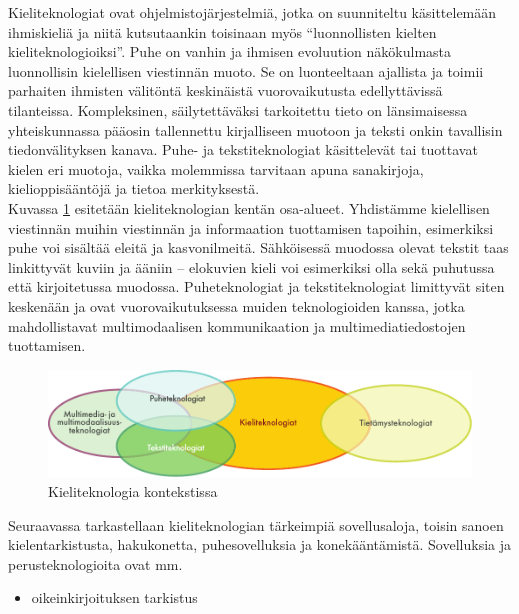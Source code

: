 \begin{multicols}{2}
Kieliteknologiat ovat ohjelmistojärjestelmiä, jotka on suunniteltu
käsittelemään ihmiskieliä ja niitä kutsutaankin toisinaan myös
“luonnollisten kielten kieliteknologioiksi”. Puhe on vanhin ja ihmisen 
evoluution näkökulmasta luonnollisin kielellisen viestinnän muoto. Se on 
luonteeltaan ajallista ja toimii parhaiten 
ihmisten välitöntä keskinäistä vuorovaikutusta edellyttävissä tilanteissa. 
Kompleksinen, säilytettäväksi tarkoitettu tieto on länsimaisessa yhteiskunnassa
pääosin tallennettu kirjalliseen muotoon ja teksti onkin tavallisin
tiedonvälityksen kanava. Puhe- ja tekstiteknologiat käsittelevät tai
tuottavat kielen eri muotoja, vaikka molemmissa tarvitaan apuna
sanakirjoja, kielioppisääntöjä ja tietoa merkityksestä.\\
Kuvassa \ref{fig:ltincontext-fin} esitetään kieliteknologian kentän
osa-alueet.  Yhdistämme kielellisen viestinnän muihin viestinnän ja
informaation tuottamisen tapoihin, esimerkiksi puhe voi sisältää
eleitä ja kasvonilmeitä. Sähköisessä muodossa olevat tekstit taas
linkittyvät kuviin ja ääniin -- elokuvien kieli voi esimerkiksi olla
sekä puhutussa että kirjoitetussa muodossa. Puheteknologiat ja
tekstiteknologiat limittyvät siten keskenään ja ovat
vuorovaikutuksessa muiden teknologioiden kanssa, jotka mahdollistavat
multimodaalisen kommunikaation ja multimediatiedostojen tuottamisen.

\begin{figure}[htb]
  \center
  \includegraphics[width=\textwidth]{../_media/finnish/language_technologies}
  \caption{Kieliteknologia kontekstissa}
  \label{fig:ltincontext-fin}
\end{figure}

Seuraavassa tarkastellaan kieliteknologian tärkeimpiä sovellusaloja,
toisin sanoen kielentarkistusta, hakukonetta, puhesovelluksia ja
konekääntämistä.  Sovelluksia ja perusteknologioita ovat mm.
\begin{itemize}
\item oikeinkirjoituksen tarkistus


\end{itemize}
\end{multicols}

